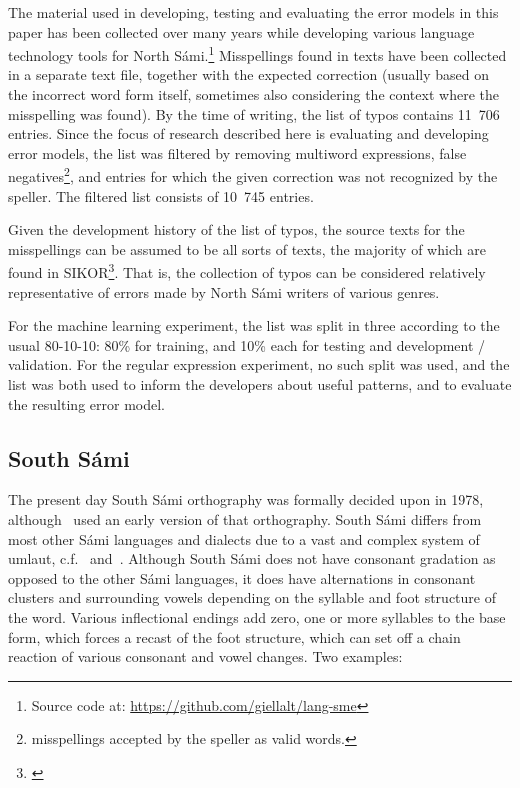 \documentclass{flammie}
\begin{document}
The material used in developing, testing and evaluating the error models in this
paper has been collected over many years while developing various language
technology tools for North Sámi.\footnote{Source code at:
\url{https://github.com/giellalt/lang-sme}} Misspellings found in texts have
been collected in a separate text file, together with the expected correction
(usually based on the incorrect word form itself, sometimes also considering the
context where the misspelling was found). By the time of writing, the list of
typos contains 11~706 entries. Since the focus of research described here is
evaluating and developing error models, the list was filtered by removing
multiword expressions, false negatives\footnote{misspellings accepted by the
speller as valid words.}, and entries for which the given correction was not
recognized by the speller. The filtered list consists of 10~745 entries.

Given the development history of the list of typos, the source texts for the
misspellings can be assumed to be all sorts of texts, the majority of which are
found in SIKOR\footnote{\cite{sikor_06.11.2018}}. That is, the collection of
typos can be considered relatively representative of errors made by North Sámi
writers of various genres.

For the machine learning experiment, the list was split in three according to
the usual 80-10-10: 80\% for training, and 10\% each for testing and development
/ validation. For the regular expression experiment, no such split was used, and
the list was both used to inform the developers about useful patterns, and to
evaluate the resulting error model.

\subsection{South Sámi}

The present day South Sámi orthography was formally decided upon in 1978,
although~\cite{bull1974lohkede} used an early version of that orthography.
South Sámi differs from most other Sámi languages and dialects due to a vast and
complex system of umlaut, c.f.~\cite{Bergsland1994sydsamisk}
and~\cite{Magga2012sorsamisk}.  Although South Sámi does not have consonant
gradation as opposed to the other Sámi languages, it does have alternations in
consonant clusters and surrounding vowels depending on the syllable and foot
structure of the word. Various inflectional endings add zero, one or more
syllables to the base form, which forces a recast of the foot structure, which
can set off a chain reaction of various consonant and vowel changes. Two
examples:
\end{document}
